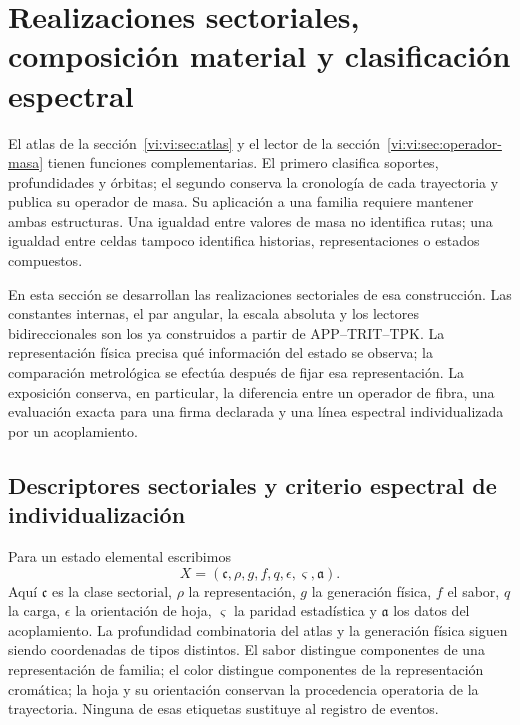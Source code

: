 \section{Realizaciones sectoriales, composición material y clasificación espectral}
\label{vi:vi:sec:familias-compuestos}

El atlas de la sección~\ref{vi:vi:sec:atlas} y el lector de la
sección~\ref{vi:vi:sec:operador-masa} tienen funciones complementarias. El
primero clasifica soportes, profundidades y órbitas; el segundo conserva la
cronología de cada trayectoria y publica su operador de masa. Su aplicación
a una familia requiere mantener ambas estructuras. Una igualdad entre
valores de masa no identifica rutas; una igualdad entre celdas tampoco
identifica historias, representaciones o estados compuestos.

En esta sección se desarrollan las realizaciones sectoriales de esa
construcción. Las constantes internas, el par angular, la escala absoluta
y los lectores bidireccionales son los ya construidos a partir de
APP--TRIT--TPK. La representación física precisa qué información del
estado se observa; la comparación metrológica se efectúa después de fijar
esa representación. La exposición conserva, en particular, la diferencia
entre un operador de fibra, una evaluación exacta para una firma declarada
y una línea espectral individualizada por un acoplamiento.

\subsection{Descriptores sectoriales y criterio espectral de individualización}
\label{vi:vi:subsec:descriptor-familia}

Para un estado elemental escribimos
\[
 X=(\mathfrak c,\rho,g,f,q,\epsilon,\varsigma,\mathfrak a).
\]
Aquí \(\mathfrak c\) es la clase sectorial, \(\rho\) la representación,
\(g\) la generación física, \(f\) el sabor, \(q\) la carga,
\(\epsilon\) la orientación de hoja, \(\varsigma\) la paridad estadística
y \(\mathfrak a\) los datos del acoplamiento. La profundidad combinatoria
del atlas y la generación física siguen siendo coordenadas de tipos
distintos. El sabor distingue componentes de una representación de
familia; el color distingue componentes de la representación cromática;
la hoja y su orientación conservan la procedencia operatoria de la
trayectoria. Ninguna de esas etiquetas sustituye al registro de eventos.


